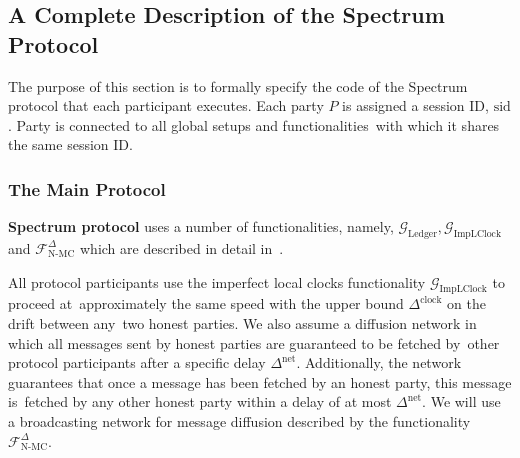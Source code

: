 \subsection{A Complete Description of the Spectrum Protocol}\label{subsec:a-complete-description-of-the-spectrum-protocol}
The purpose of this section is to formally specify the code of the Spectrum protocol that each participant executes.
Each party $P$ is assigned a session ID, $\text{sid}$.
Party is connected to all global setups and functionalities\
with which it shares the same session ID\@.

\subsubsection{The Main Protocol}
\textbf{Spectrum protocol} uses a number of functionalities, namely, $\mathcal{G}_{\text{Ledger}},
\mathcal{G}_{\text{ImpLClock}}$ and $\mathcal{F}^{\Delta}_{\text{N-MC}}$ which are described in detail in~\cite{cryptoeprint:2019/838}.

All protocol participants use the imperfect local clocks functionality $\mathcal{G}_{\text{ImpLClock}}$ to proceed at\
approximately the same speed with the upper bound $\Delta^{\text{clock}}$ on the drift between any\
two honest parties.
We also assume a diffusion network in which all messages sent by honest parties are guaranteed to be fetched by\
other protocol participants after a specific delay $\Delta^{\text{net}}$.
Additionally, the network guarantees that once a message has been fetched by an honest party, this message is\
fetched by any other honest party within a delay of at most $\Delta^{\text{net}}$.
We will use a broadcasting network for message diffusion described by the functionality $\mathcal{F}^{\Delta}_{\text{N-MC}}$.

